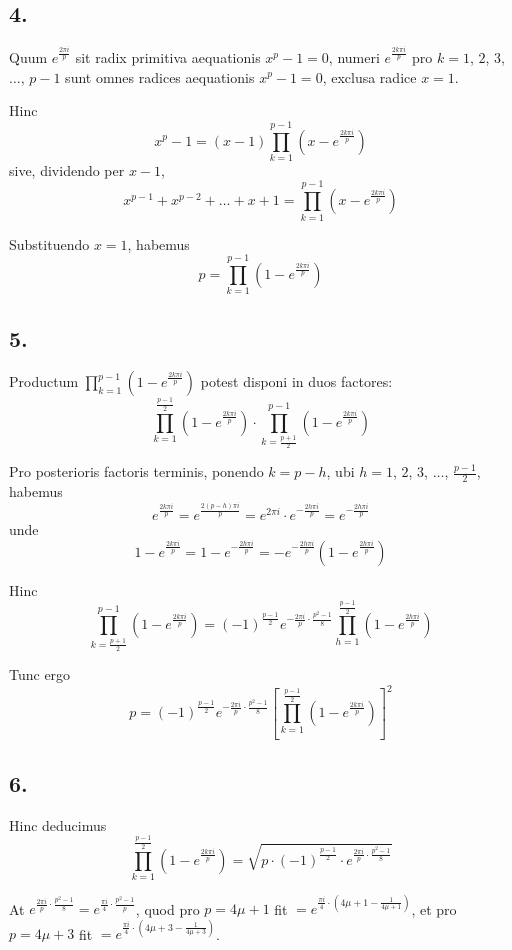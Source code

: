 \documentclass[12pt,a4paper]{article}
\theoremstyle{plain}
\theoremstyle{definition}
\theoremstyle{remark}
\begin{document}
\subsection*{4.}
Quum $e^{\frac{2\pi i}{p}}$ sit radix primitiva aequationis $x^p-1=0$, numeri $e^{\frac{2k\pi i}{p}}$ pro $k=1$, $2$, $3$, $\ldots$, $p-1$ sunt omnes radices aequationis $x^p-1=0$, exclusa radice $x=1$.

Hinc
\[x^p-1 = (x-1)\prod_{k=1}^{p-1}(x-e^{\frac{2k\pi i}{p}})\]
sive, dividendo per $x-1$,
\[x^{p-1}+x^{p-2}+\ldots+x+1 = \prod_{k=1}^{p-1}(x-e^{\frac{2k\pi i}{p}})\]

Substituendo $x=1$, habemus
\[p = \prod_{k=1}^{p-1}(1-e^{\frac{2k\pi i}{p}})\]

\subsection*{5.}
Productum $\prod_{k=1}^{p-1}(1-e^{\frac{2k\pi i}{p}})$ potest disponi in duos factores:
\[\prod_{k=1}^{\frac{p-1}{2}}(1-e^{\frac{2k\pi i}{p}}) \cdot \prod_{k=\frac{p+1}{2}}^{p-1}(1-e^{\frac{2k\pi i}{p}})\]

Pro posterioris factoris terminis, ponendo $k=p-h$, ubi $h=1$, $2$, $3$, $\ldots$, $\frac{p-1}{2}$, habemus
\[e^{\frac{2k\pi i}{p}} = e^{\frac{2(p-h)\pi i}{p}} = e^{2\pi i} \cdot e^{-\frac{2h\pi i}{p}} = e^{-\frac{2h\pi i}{p}}\]
unde
\[1-e^{\frac{2k\pi i}{p}} = 1-e^{-\frac{2h\pi i}{p}} = -e^{-\frac{2h\pi i}{p}}(1-e^{\frac{2h\pi i}{p}})\]

Hinc
\[\prod_{k=\frac{p+1}{2}}^{p-1}(1-e^{\frac{2k\pi i}{p}}) = (-1)^{\frac{p-1}{2}} e^{-\frac{2\pi i}{p}\cdot\frac{p^2-1}{8}} \prod_{h=1}^{\frac{p-1}{2}}(1-e^{\frac{2h\pi i}{p}})\]

Tunc ergo
\[p = (-1)^{\frac{p-1}{2}} e^{-\frac{2\pi i}{p}\cdot\frac{p^2-1}{8}} \left[\prod_{k=1}^{\frac{p-1}{2}}(1-e^{\frac{2k\pi i}{p}})\right]^2\]

\newpage
\subsection*{6.}
Hinc deducimus
\[\prod_{k=1}^{\frac{p-1}{2}}(1-e^{\frac{2k\pi i}{p}}) = \sqrt{p \cdot (-1)^{\frac{p-1}{2}} \cdot e^{\frac{2\pi i}{p}\cdot\frac{p^2-1}{8}}}\]

At $e^{\frac{2\pi i}{p}\cdot\frac{p^2-1}{8}} = e^{\frac{\pi i}{4}\cdot\frac{p^2-1}{p}}$, quod pro $p=4\mu+1$ fit $=e^{\frac{\pi i}{4}\cdot(4\mu+1-\frac{1}{4\mu+1})}$, et pro $p=4\mu+3$ fit $=e^{\frac{\pi i}{4}\cdot(4\mu+3-\frac{1}{4\mu+3})}$.
\end{document}
